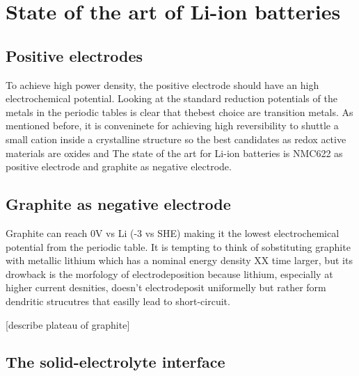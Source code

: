 \section{State of the art of Li-ion batteries}

\subsection{Positive electrodes}

To achieve high power density, the positive electrode should have an high electrochemical potential. Looking at the standard reduction potentials of the metals in the periodic tables is clear that thebest choice are transition metals. As mentioned before, it is conveninete for achieving high reversibility to shuttle a small cation inside a crystalline structure so the best candidates as redox active materials are oxides and  The state of the art for Li-ion batteries is NMC622 as positive electrode and graphite as negative electrode. 

\subsection{Graphite as negative electrode}

Graphite can reach 0V vs Li (-3 vs SHE) making it the lowest electrochemical potential from the periodic table. It is tempting  to think of sobstituting graphite with metallic lithium which has a nominal energy density XX time larger, but its drowback is the morfology of electrodeposition because lithium, especially at higher current desnities, doesn't electrodeposit uniformelly but rather form dendritic strucutres that easilly lead to short-circuit. 

[describe plateau of graphite]

\subsection{The solid-electrolyte interface}


